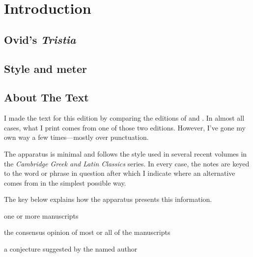 \chapter*{Introduction}

\section*{Ovid's \textit{Tristia}}

\section*{Style and meter}

\section*{About The Text}

I made the text for this edition by comparing the editions of \citet{owen1915}
and \citet{hall1998}. In almost all cases, what I print comes from one of those
two editions. However, I've gone my own way a few times---mostly over
punctuation.

The apparatus is minimal and follows the style used in several recent volumes
in the \textit{Cambridge Greek and Latin Classics} series. In every case, the
notes are keyed to the word or phrase in question after which I indicate
where an alternative comes from in the simplest possible way.

The key below explains how the apparatus presents this information.

\begin{description}%
    [style=sameline,leftmargin=70pt,labelwidth=\widthof{\textbf{Name}}]
    \item[m] one or more manuscripts
    \item[mss] the consensus opinion of most or all of the manuscripts
    \item[Name] a conjecture suggested by the named author
\end{description}
